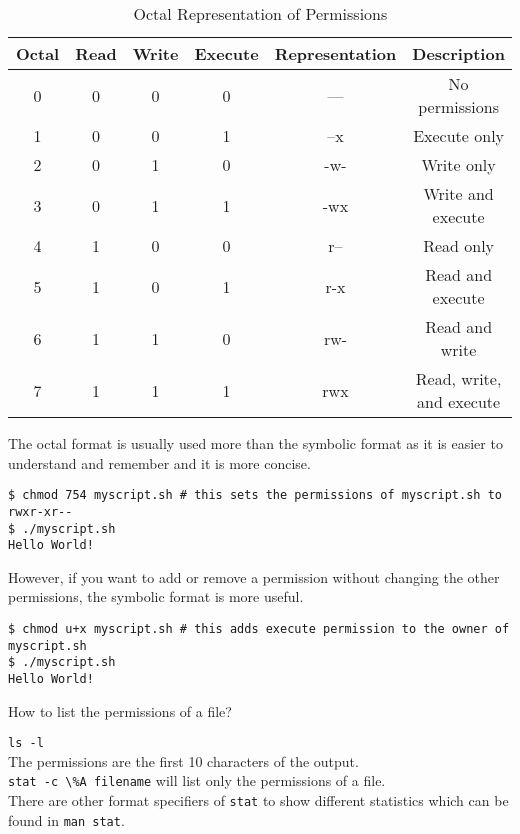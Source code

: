 \begin{table*}
\caption{Octal Representation of Permissions}
\begin{tabular}{ c c c c c c }
  \toprule
  Octal & Read & Write & Execute & Representation & Description \\
 \midrule
  0 & 0 & 0 & 0 & --- & No permissions \\
  1 & 0 & 0 & 1 & --x & Execute only \\
  2 & 0 & 1 & 0 & -w- & Write only \\
  3 & 0 & 1 & 1 & -wx & Write and execute \\
  4 & 1 & 0 & 0 & r-- & Read only \\
  5 & 1 & 0 & 1 & r-x & Read and execute \\
  6 & 1 & 1 & 0 & rw- & Read and write \\
  7 & 1 & 1 & 1 & rwx & Read, write, and execute \\
 \bottomrule
\end{tabular}
\end{table*}

The octal format is usually used more than the symbolic format as it is easier to understand and remember and it is more concise.

\begin{lstlisting}
$ chmod 754 myscript.sh # this sets the permissions of myscript.sh to rwxr-xr--
$ ./myscript.sh
Hello World!
\end{lstlisting}

However, if you want to add or remove a permission without changing the other permissions, the symbolic format is more useful.

\begin{lstlisting}
$ chmod u+x myscript.sh # this adds execute permission to the owner of myscript.sh
$ ./myscript.sh
Hello World!
\end{lstlisting}

\begin{qs}
  How to list the permissions of a file?
\end{qs}

\begin{ans}
  \lstinline|ls -l| \\
  The permissions are the first 10 characters of the output.\\
  \lstinline|stat -c \%A filename| will list only the permissions of a file.\\
  There are other format specifiers of \lstinline|stat| to show different statistics
  which can be found in \lstinline|man stat|.
\end{ans}

